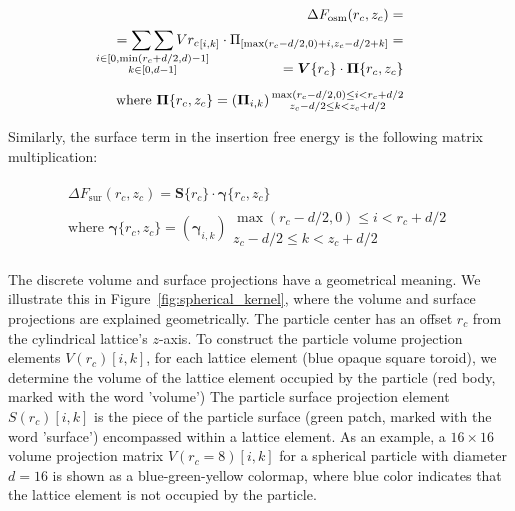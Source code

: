 \documentclass[10pt, a4paper]{article}
\begin{document}
\begin{multicols}{2}
\begin{eqnarray}
    \begin{split}
        \Delta F_{\text{osm}}(r_c, z_c) =\\
        = \mathop{\sum\sum}_{\mathclap{\substack{i \in [0, \min(r_c+d/2,d)-1] \\ k \in [0, d-1]}}} V{r_c}_{[i, k]} \cdot \Pi_{[\max(r_c-d/2,0)+i, z_c-d/2+k]} =\\[-15pt]
        = \bm{V}\{r_c\} \cdot \bm{\Pi}\{r_c, z_c\} \\[5pt]
        \text{where } \bm{\Pi}\{r_c,z_c\} =\left(\bm{\Pi}_{i,k}\right) {\substack{\max(r_c-d/2,0) \le i < r_c+d/2 \\ z_c-d/2 \le k < z_c+d/2}}
    \end{split}
\end{eqnarray}

Similarly, the surface term in the insertion free energy is the following matrix multiplication:

\begin{eqnarray}
    \begin{split}
        \Delta F_{\text{sur}}(r_c, z_c) = \bm{S}\{r_c\} \cdot \bm{\gamma}\{r_c, z_c\} \\[5pt]
        \text{where } \bm{\gamma}\{r_c,z_c\} =\left(\bm{\gamma}_{i,k}\right) {\substack{\max(r_c-d/2,0) \le i < r_c+d/2 \\ z_c-d/2 \le k < z_c+d/2}}
    \end{split}
\end{eqnarray}

The discrete volume and surface projections have a geometrical meaning.
We illustrate this in Figure~\ref{fig:spherical_kernel}, where the volume and surface projections are explained geometrically.
The particle center has an offset $r_c$ from the cylindrical lattice's $z$-axis.
To construct the particle volume projection elements $V(r_c)[i, k]$, for each lattice element (blue opaque square toroid), we determine the volume of the lattice element occupied by the particle (red body, marked with the word 'volume')
The particle surface projection element $S(r_c)[i, k]$ is the piece of the particle surface (green patch, marked with the word 'surface') encompassed within a lattice element.
As an example, a $16 \times 16$ volume projection matrix $V(r_c = 8)[i, k]$ for a spherical particle with diameter $d = 16$ is shown as a blue-green-yellow colormap, where blue color indicates that the lattice element is not occupied by the particle.


\end{multicols}
\end{document}
